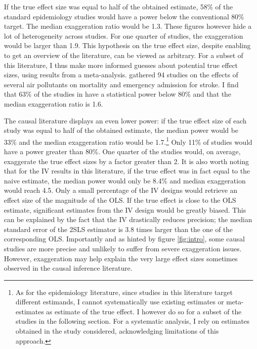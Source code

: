 \documentclass[usletter, 12pt]{article}
\begin{document}
			If the true effect size was equal to half of the obtained estimate, 58\% of the standard epidemiology studies would have a power below the conventional 80\% target. The median exaggeration ratio would be 1.3. These figures however hide a lot of heterogeneity across studies. For one quarter of studies, the exaggeration would be larger than 1.9. This hypothesis on the true effect size, despite enabling to get an overview of the literature, can be viewed as arbitrary. For a subset of this literature, I thus make more informed guesses about potential true effect sizes, using results from a meta-analysis. \cite{shah_short_2015} gathered 94 studies on the effects of several air pollutants on mortality and emergency admission for stroke. I find that 63\% of the studies in \cite{shah_short_2015} have a statistical power below 80\% and that the median exaggeration ratio is 1.6.
			
			The causal literature displays an even lower power: if the true effect size of each study was equal to half of the obtained estimate, the median power would be 33\% and the median exaggeration ratio would be 1.7.\footnote{As for the epidemiology literature, since studies in this literature target different estimands, I cannot systematically use existing estimates or meta-estimates as estimate of the true effect. I however do so for a subset of the studies in the following section. For a systematic analysis, I rely on estimates obtained in the study considered, acknowledging limitations of this approach.} Only 11\% of studies would have a power greater than 80\%. One quarter of the studies would, on average, exaggerate the true effect sizes by a factor greater than 2. It is also worth noting that for the IV results in this literature, if the true effect was in fact equal to the naive estimate, the median power would only be 8.4\% and median exaggeration would reach 4.5. Only a small percentage of the IV designs would retrieve an effect size of the magnitude of the OLS. If the true effect is close to the OLS estimate, significant estimates from the IV design would be greatly biased. This can be explained by the fact that the IV drastically reduces precision; the median standard error of the 2SLS estimator is 3.8 times larger than the one of the corresponding OLS.
			 Importantly and as hinted by figure \ref{fig:intro}, some causal studies are more precise and unlikely to suffer from severe exaggeration issues. However, exaggeration may help explain the very large effect sizes sometimes observed in the causal inference literature. 
			 
\end{document}
